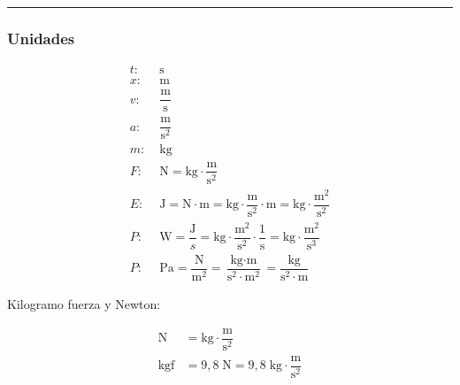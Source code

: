 \skipline
\hrule
\skipline

\subsubsection*{Unidades}

\vspace{-3em}
\begin{align*}
t:\;& \text{s}\\
x:\;& \text{m}\\
v:\;& \dfrac{\text{m}}{\text{s}}\\
a:\;& \dfrac{\text{m}}{\text{s}^2}\\
m:\;& \text{kg}\\
F:\;&  \text{N} = \text{kg}\cdot \dfrac{\text{m}}{\text{s}^2}\\
E:\;&  \text{J} = \text{N}\cdot\text{m} = \text{kg}\cdot \dfrac{\text{m}}{\text{s}^2} \cdot \text{m} = \text{kg}\cdot \dfrac{\text{m}^2}{\text{s}^2}\\
P:\;& \text{W} = \dfrac{\text{J}}{s} = \text{kg}\cdot \dfrac{\text{m}^2}{\text{s}^2} \cdot \dfrac{1}{\text{s}} = \text{kg}\cdot \dfrac{\text{m}^2}{\text{s}^3}\\
P:\;&\text{Pa} = \dfrac{\text{N}}{\text{m}^2} = \dfrac{\text{kg}\cdot \text{m}}{\text{s}^2 \cdot \text{m}^2} = \dfrac{\text{kg}}{\text{s}^2 \cdot \text{m}}
\end{align*}

Kilogramo fuerza y Newton:

\begin{align*}
    \text{N} &= \text{kg} \cdot \dfrac{\text{m}}{\text{s}^2}\\
    \text{kgf} &= 9,8 \;\text{N} = 9,8\;\text{kg} \cdot \dfrac{\text{m}}{\text{s}^2} \\
\end{align*}

\newpage

